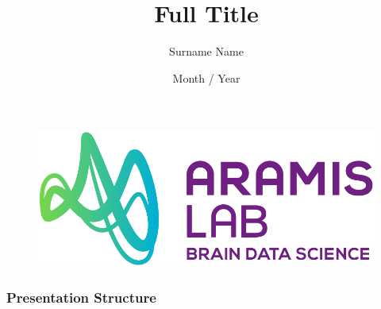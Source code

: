 \documentclass[
	11pt, %
]{beamer}
\title[Short Title]{Full Title}
\author[Surname Name]{Surname Name}
\institute[ICM]{ARAMIS Lab \\ ICM}
\date[2024]{Month / Year}
\begin{document}

\begin{frame}
	\begin{figure}
		\includegraphics[width=0.45\linewidth]{logo/logo_ARAMISLAB.png}
	\end{figure}
	\titlepage %
\end{frame}


\begin{frame}
	\frametitle{Presentation Structure} %
	\tableofcontents %
\end{frame}



 
 
 

\end{document}
